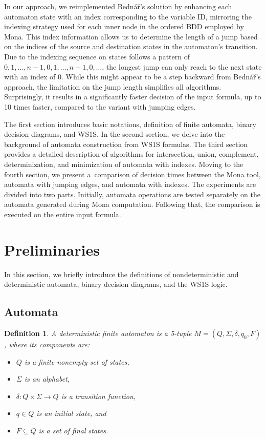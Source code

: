 \documentclass[pdflatex,sn-mathphys-num]{sn-jnl}%
\theoremstyle{thmstyleone}%
\theoremstyle{thmstyletwo}%
\theoremstyle{thmstylethree}%
\newtheorem{definition}{Definition}%
\begin{document}
    In our approach, we reimplemented Bednář's solution by enhancing each automaton state with an index corresponding to the variable ID, mirroring the indexing strategy used for each inner node in the ordered BDD employed by Mona. This index information allows us to determine the length of a jump based on the indices of the source and destination states in the automaton's transition. Due to the indexing sequence on states follows a pattern of $0, 1, \dots, n-1, 0, 1, \dots, n-1, 0, \dots$, the longest jump can only reach to the next state with an index of $0$. While this might appear to be a step backward from Bednář's approach, the limitation on the jump length simplifies all algorithms. Surprisingly, it results in a significantly faster decision of the input formula, up to 10 times faster, compared to the variant with jumping edges.

    The first section introduces basic notations, definition of finite automata, binary decision diagrams, and WS1S. In the second section, we delve into the background of automata construction from WS1S formulas. The third section provides a detailed description of algorithms for intersection, union, complement, determinization, and minimization of automata with indexes. Moving to the fourth section, we present a~comparison of decision times between the Mona tool, automata with jumping edges, and automata with indexes. The experiments are divided into two parts. Initially, automata operations are tested separately on the automata generated during Mona computation. Following that, the comparison is executed on the entire input formula.


\section{Preliminaries}
    In this section, we briefly introduce the definitions of nondeterministic and deterministic automata, binary decision diagrams, and the WS1S logic.

    \subsection{Automata}

        \begin{definition}
            A deterministic finite automaton is a 5-tuple $M = (Q, \Sigma, \delta, q_0, F)$, where its components are:
            \begin{itemize}[noindent]
                \item $Q$ is a finite nonempty set of states,
                \item $\Sigma$ is an alphabet,
                \item $\delta : Q \times \Sigma \rightarrow Q$ is a transition function,
                \item $q \in Q$ is an initial state, and
                \item $F \subseteq Q$ is a set of final states.
            \end{itemize}
        \end{definition}
\end{document}
